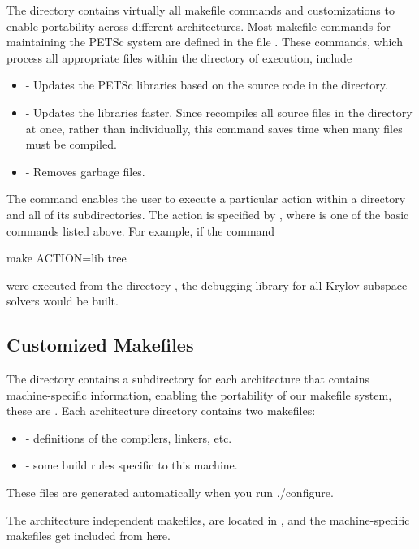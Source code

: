 {{{The directory  contains virtually all
makefile commands and customizations to enable portability across
different architectures.  Most makefile commands for maintaining the
PETSc system are defined in the file .  
These commands, which process all appropriate files within the
directory of execution, include
\begin{itemize}
\item {} - Updates the PETSc libraries based on the source code
      in the directory.
\item {} - Updates the libraries faster.  Since
       recompiles all source files in the directory at once,
      rather than individually, this command saves time when many files
      must be compiled.
\item {} - Removes garbage files.
\end{itemize}

The  command enables the user to execute a particular action
within a directory and all of its subdirectories.  The action is specified
by , where  is one of the basic commands
listed above. For example, if the command
\begin{tabbing}
   make ACTION=lib tree
\end{tabbing}
were executed from the directory ,
the debugging library for all Krylov subspace solvers would be built.

\subsection{Customized Makefiles}
\label{sec_custom}

The directory  contains a subdirectory for each 
architecture that contains machine-specific information, enabling the
portability of our makefile system, these are .
 Each architecture directory contains
two makefiles:
\begin{itemize}
\item {} - definitions of the compilers, linkers, etc.
\item {} - some build rules specific to this machine.
\end{itemize}
These files are generated automatically when you run ./configure.

The architecture independent makefiles, are located in
, and the machine-specific
makefiles get included from here.

}}}
